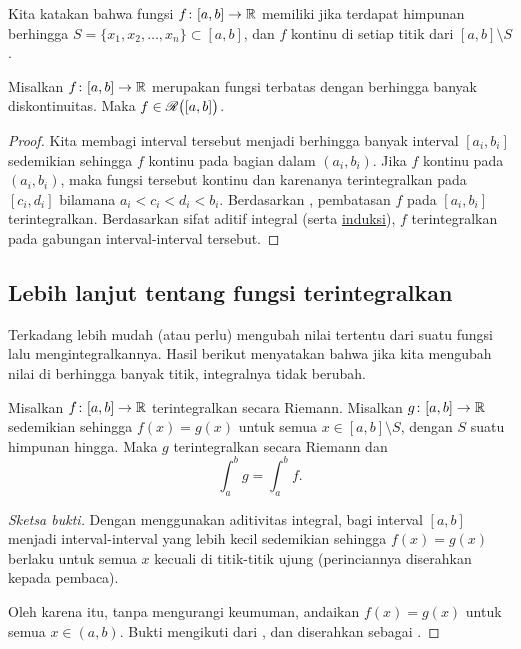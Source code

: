 Kita katakan bahwa fungsi $f \colon [a,b] \to {\mathbb{R}}$ memiliki \emph{} jika terdapat himpunan berhingga $S = \{ x_1, x_2, \ldots, x_n \}
\subset [a,b]$, dan $f$ kontinu
di setiap titik dari $[a,b] \setminus S$.

\begin{thm}
Misalkan $f \colon [a,b] \to {\mathbb{R}}$ merupakan fungsi terbatas dengan berhingga
banyak diskontinuitas.  Maka $f \in {\mathscr{R}}\bigl([a,b]\bigr)$.
\end{thm}

\begin{proof}
Kita membagi interval tersebut menjadi berhingga banyak interval $[a_i,b_i]$
sedemikian sehingga $f$ kontinu
pada bagian dalam $(a_i,b_i)$.  Jika $f$ kontinu pada $(a_i,b_i)$,
maka fungsi tersebut kontinu dan karenanya terintegralkan pada $[c_i,d_i]$ bilamana $a_i < c_i < d_i < b_i$.  Berdasarkan
,
pembatasan
$f$ pada $[a_i,b_i]$ terintegralkan.
Berdasarkan sifat aditif integral (serta \hyperref[induction:thm]{induksi}),
$f$ terintegralkan pada gabungan interval-interval tersebut.
\end{proof}

\subsection{Lebih lanjut tentang fungsi terintegralkan}

Terkadang lebih mudah (atau perlu)
mengubah nilai tertentu dari suatu fungsi lalu
mengintegralkannya.  Hasil berikut menyatakan
bahwa jika kita mengubah nilai di berhingga
banyak titik, integralnya tidak berubah.

\begin{prop}
Misalkan $f \colon [a,b] \to {\mathbb{R}}$ terintegralkan secara Riemann.  Misalkan $g \colon [a,b] \to
{\mathbb{R}}$ sedemikian sehingga $f(x) = g(x)$ untuk semua $x \in [a,b] \setminus S$,
dengan $S$ suatu himpunan hingga.
Maka $g$ terintegralkan secara Riemann dan
\begin{equation*}
\int_a^b g = \int_a^b f.
\end{equation*}
\end{prop}

\begin{proof}[Sketsa bukti]
Dengan menggunakan aditivitas integral, bagi interval $[a,b]$ menjadi
interval-interval yang lebih kecil sedemikian sehingga $f(x) = g(x)$ berlaku untuk semua $x$ kecuali di
titik-titik ujung (perinciannya diserahkan kepada pembaca).

Oleh karena itu, tanpa mengurangi keumuman, andaikan $f(x) = g(x)$ untuk
semua $x \in (a,b)$.  Bukti mengikuti dari ,
dan diserahkan sebagai .
\end{proof}

